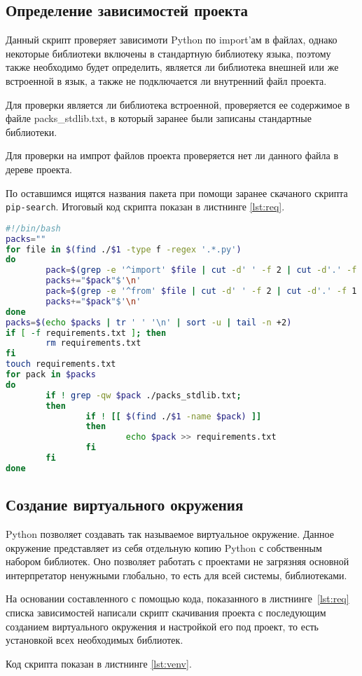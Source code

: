 \subsection{Определение зависимостей проекта}
Данный скрипт проверяет зависимоти Python по import’ам в файлах,
однако некоторые библиотеки включены в стандартную библиотеку языка, поэтому
также необходимо будет определить, является ли библиотека внешней или
же встроенной в язык, а также не подключается ли внутренний файл проекта.\par
Для проверки является ли библиотека встроенной,
проверяется ее содержимое в файле packs\_stdlib.txt, в который
заранее были записаны стандартные библиотеки.\par
Для проверки на импрот файлов
проекта проверяется нет ли данного файла в дереве проекта.\par
По оставшимся ищятся названия пакета при помощи заранее скачаного скрипта
\texttt{pip-search}.
Итоговый код скрипта показан в листнинге \ref{lst:req}.

\begin{lstlisting}[language=Bash
	, caption=\leftline{Определение зависимостей проекта}
	, label=lst:req]
#!/bin/bash
packs=""
for file in $(find ./$1 -type f -regex '.*.py')
do
        pack=$(grep -e '^import' $file | cut -d' ' -f 2 | cut -d'.' -f 1)
        packs+="$pack"$'\n'
        pack=$(grep -e '^from' $file | cut -d' ' -f 2 | cut -d'.' -f 1 )
        packs+="$pack"$'\n'
done
packs=$(echo $packs | tr ' ' '\n' | sort -u | tail -n +2)
if [ -f requirements.txt ]; then
        rm requirements.txt
fi
touch requirements.txt
for pack in $packs
do
        if ! grep -qw $pack ./packs_stdlib.txt;
        then
                if ! [[ $(find ./$1 -name $pack) ]]
                then
                        echo $pack >> requirements.txt
                fi
        fi
done
\end{lstlisting}

\subsection{Создание виртуального окружения}
Python позволяет создавать так называемое виртуальное окружение.
Данное окружение представляет из себя отдельную копию Python с
собственным набором библиотек. Оно позволяет работать с проектами не
загрязняя основной интерпретатор ненужными глобально, то есть для всей
системы, библиотеками.\par
На основании составленного с помощью кода, показанного
в листнинге~\ref{lst:req} списка зависимостей
написали скрипт скачивания проекта с
последующим созданием виртуального окружения и настройкой его под
проект, то есть установкой всех необходимых библиотек.\par
Код скрипта показан в листнинге \ref{lst:venv}.

